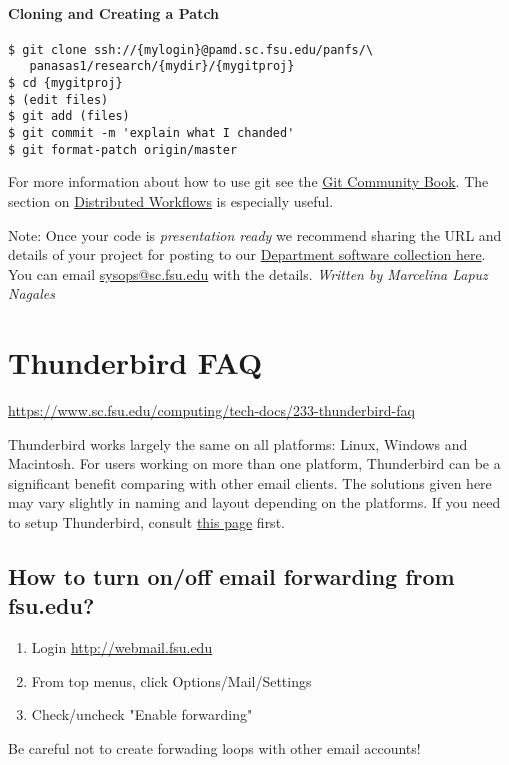 \documentclass[12pt,a4paper]{article}
\begin{document}
\paragraph{Cloning and Creating a Patch}
\begin{verbatim}
$ git clone ssh://{mylogin}@pamd.sc.fsu.edu/panfs/\
   panasas1/research/{mydir}/{mygitproj}
$ cd {mygitproj}
$ (edit files)
$ git add (files)
$ git commit -m 'explain what I chanded'
$ git format-patch origin/master
\end{verbatim}
For more information about how to use git see the \href{https://git-scm.com/book/en/v2}{Git Community Book}. The section on \href{https://git-scm.com/book/en/v2/Distributed-Git-Distributed-Workflows}{Distributed Workflows} is especially useful.

Note: Once your code is \textit{presentation ready} we recommend sharing the URL and details of your project for posting to our \href{http://www.sc.fsu.edu/research/departmental-software}{Department software collection here}. You can email \href{mailto:sysops@sc.fsu.edu}{sysops@sc.fsu.edu} with the details.
\hfill \textit{Written by Marcelina Lapuz Nagales}

\section{Thunderbird FAQ}
\url{https://www.sc.fsu.edu/computing/tech-docs/233-thunderbird-faq}

Thunderbird works largely the same on all platforms: Linux, Windows and Macintosh. For users working on more than one platform, Thunderbird can be a significant benefit comparing with other email clients. The solutions given here may vary slightly in naming and layout depending on the platforms. If you need to setup Thunderbird, consult \href{https://www.sc.fsu.edu/computing/tech-docs/178-email}{this page} first.

\subsection*{How to turn on/off email forwarding from fsu.edu?}
\begin{enumerate}
    \item Login \url{http://webmail.fsu.edu}
    \item From top menus, click Options/Mail/Settings
    \item Check/uncheck "Enable forwarding"
\end{enumerate}
Be careful not to create forwading loops with other email accounts!
\end{document}
